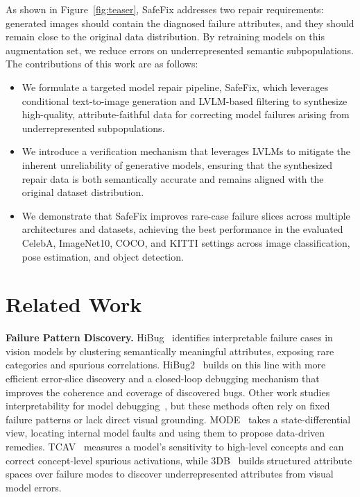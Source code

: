 \documentclass[10pt]{article} %
\newcommand{\model}{SafeFix\xspace}
\newcommand{\hibug}{HiBug\xspace}
\begin{document}
As shown in Figure~\ref{fig:teaser}, \model addresses two repair requirements: generated images should contain the diagnosed failure attributes, and they should remain close to the original data distribution. By retraining models on this augmentation set, we reduce errors on underrepresented semantic subpopulations. The contributions of this work are as follows:
\begin{itemize}
\item We formulate a targeted model repair pipeline, \model, which leverages conditional text-to-image generation and LVLM-based filtering to synthesize high-quality, attribute-faithful data for correcting model failures arising from underrepresented subpopulations.

\item We introduce a verification mechanism that leverages LVLMs to mitigate the inherent unreliability of generative models, ensuring that the synthesized repair data is both semantically accurate and remains aligned with the original dataset distribution.

\item We demonstrate that \model{} improves rare-case failure slices across multiple architectures and datasets, achieving the best performance in the evaluated CelebA, ImageNet10, COCO, and KITTI settings across image classification, pose estimation, and object detection.
\end{itemize}

\section{Related Work}
\textbf{Failure Pattern Discovery.} \hibug~\citep{chen2023hibug} identifies interpretable failure cases in vision models by clustering semantically meaningful attributes, exposing rare categories and spurious correlations.
HiBug2~\citep{chen2025hibug2} builds on this line with more efficient error-slice discovery and a closed-loop debugging mechanism that improves the coherence and coverage of discovered bugs.
Other work studies interpretability for model debugging~\citep{adebayo2020debugging, adebayo2022posthoc}, but these methods often rely on fixed failure patterns or lack direct visual grounding.
MODE~\citep{vendrow2023dataset} takes a state-differential view, locating internal model faults and using them to propose data-driven remedies.
TCAV~\citep{kim2018tcav} measures a model's sensitivity to high-level concepts and can correct concept-level spurious activations, while 3DB~\citep{leclerc20223db} builds structured attribute spaces over failure modes to discover underrepresented attributes from visual model errors.
\end{document}
